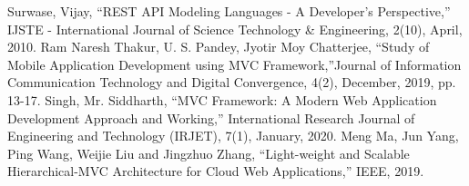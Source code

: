 \documentclass[conference]{IEEEtran}
\begin{document}
\begin{thebibliography}{00}
 Surwase, Vijay, ``REST API Modeling Languages - A Developer’s Perspective,'' IJSTE - International Journal of Science Technology & Engineering, 2(10), April, 2010.
 Ram Naresh Thakur, U. S. Pandey, Jyotir Moy Chatterjee, ``Study of Mobile Application Development using MVC Framework,''Journal of Information Communication Technology and Digital Convergence, 4(2), December, 2019, pp. 13-17. 
 Singh, Mr. Siddharth, ``MVC Framework: A Modern Web Application Development Approach and Working,'' International Research Journal of Engineering and Technology (IRJET), 7(1), January, 2020.
 Meng Ma, Jun Yang, Ping Wang, Weijie Liu and Jingzhuo Zhang, ``Light-weight and Scalable Hierarchical-MVC
Architecture for Cloud Web Applications,'' IEEE, 2019.
\end{thebibliography}
\end{document}
